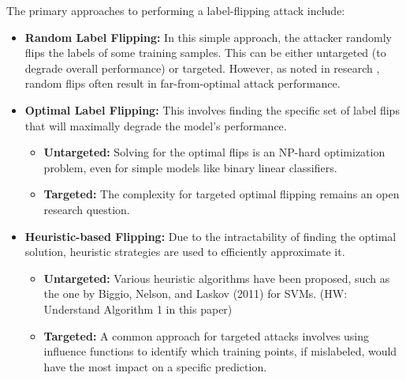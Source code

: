\documentclass[11pt]{report}
\begin{document}
The primary approaches to performing a label-flipping attack include:
\begin{itemize}
    \item \textbf{Random Label Flipping:} 
    In this simple approach, the attacker randomly flips the labels of some training samples. This can be either untargeted (to degrade overall performance) or targeted. However, as noted in research \cite{Xiao_2015}, random flips often result in far-from-optimal attack performance.

    \item \textbf{Optimal Label Flipping:}
    This involves finding the specific set of label flips that will maximally degrade the model's performance. 
    \begin{itemize}
        \item \textbf{Untargeted:} Solving for the optimal flips is an NP-hard optimization problem, even for simple models like binary linear classifiers.
        \item \textbf{Targeted:} The complexity for targeted optimal flipping remains an open research question.
    \end{itemize}

    \item \textbf{Heuristic-based Flipping:}
    Due to the intractability of finding the optimal solution, heuristic strategies are used to efficiently approximate it.
    \begin{itemize}
        \item \textbf{Untargeted:} Various heuristic algorithms have been proposed, such as the one by Biggio, Nelson, and Laskov (2011) for SVMs. \cite{biggio2013poisoningattackssupportvector} (HW: Understand Algorithm 1 in this paper)
        \item \textbf{Targeted:} A common approach for targeted attacks involves using influence functions to identify which training points, if mislabeled, would have the most impact on a specific prediction.
    \end{itemize}
\end{itemize}




\end{document}
